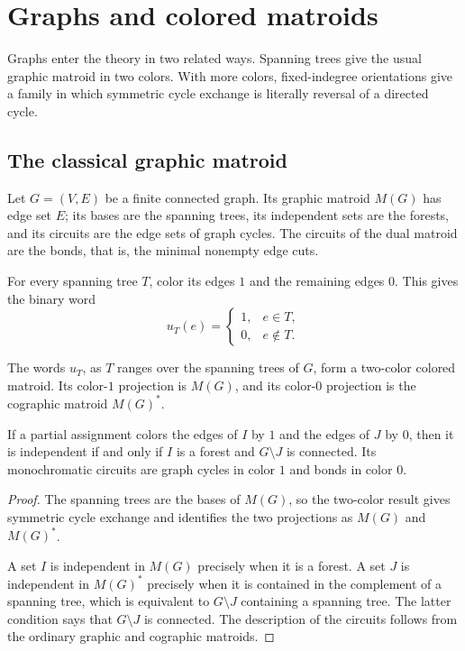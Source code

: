 
\section[graphsAndColoredMatroids]{Graphs and colored matroids}

Graphs enter the theory in two related ways. Spanning trees give the usual
graphic matroid in two colors. With more colors, fixed-indegree orientations
give a family in which symmetric cycle exchange is literally reversal of a
directed cycle.

\subsection[graphicMatroids]{The classical graphic matroid}

Let $G=(V,E)$ be a finite connected graph. Its graphic matroid $M(G)$ has
edge set $E$; its bases are the spanning trees, its independent sets are the
forests, and its circuits are the edge sets of graph cycles. The circuits of
the dual matroid are the bonds, that is, the minimal nonempty edge cuts.

For every spanning tree $T$, color its edges $1$ and the remaining edges
$0$. This gives the binary word
\[
 u_T(e)=
 \begin{cases}
 1,&e\in T,\\
 0,&e\notin T.
 \end{cases}
\]

\begin{proposition}
The words $u_T$, as $T$ ranges over the spanning trees of $G$, form a
two-color colored matroid. Its color-$1$ projection is $M(G)$, and its
color-$0$ projection is the cographic matroid $M(G)^*$.

If a partial assignment colors the edges of $I$ by $1$ and the edges of $J$
by $0$, then it is independent if and only if $I$ is a forest and
$G\setminus J$ is connected. Its monochromatic circuits are graph cycles in
color $1$ and bonds in color $0$.
\end{proposition}

\begin{proof}
The spanning trees are the bases of $M(G)$, so the two-color result gives
symmetric cycle exchange and identifies the two projections as $M(G)$ and
$M(G)^*$.

A set $I$ is independent in $M(G)$ precisely when it is a forest. A set $J$
is independent in $M(G)^*$ precisely when it is contained in the complement
of a spanning tree, which is equivalent to $G\setminus J$ containing a
spanning tree. The latter condition says that $G\setminus J$ is connected.
The description of the circuits follows from the ordinary graphic and
cographic matroids.
\end{proof}

